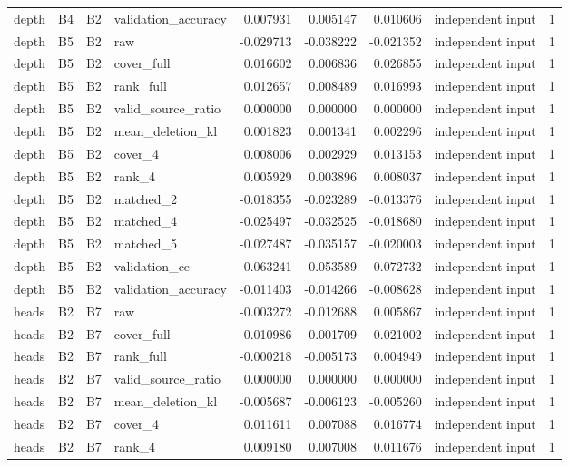 \begin{tabular}{llllrrrlr}
depth & B4 & B2 & validation_accuracy & 0.007931 & 0.005147 & 0.010606 & independent input & 1 \\
depth & B5 & B2 & raw & -0.029713 & -0.038222 & -0.021352 & independent input & 1 \\
depth & B5 & B2 & cover_full & 0.016602 & 0.006836 & 0.026855 & independent input & 1 \\
depth & B5 & B2 & rank_full & 0.012657 & 0.008489 & 0.016993 & independent input & 1 \\
depth & B5 & B2 & valid_source_ratio & 0.000000 & 0.000000 & 0.000000 & independent input & 1 \\
depth & B5 & B2 & mean_deletion_kl & 0.001823 & 0.001341 & 0.002296 & independent input & 1 \\
depth & B5 & B2 & cover_4 & 0.008006 & 0.002929 & 0.013153 & independent input & 1 \\
depth & B5 & B2 & rank_4 & 0.005929 & 0.003896 & 0.008037 & independent input & 1 \\
depth & B5 & B2 & matched_2 & -0.018355 & -0.023289 & -0.013376 & independent input & 1 \\
depth & B5 & B2 & matched_4 & -0.025497 & -0.032525 & -0.018680 & independent input & 1 \\
depth & B5 & B2 & matched_5 & -0.027487 & -0.035157 & -0.020003 & independent input & 1 \\
depth & B5 & B2 & validation_ce & 0.063241 & 0.053589 & 0.072732 & independent input & 1 \\
depth & B5 & B2 & validation_accuracy & -0.011403 & -0.014266 & -0.008628 & independent input & 1 \\
heads & B2 & B7 & raw & -0.003272 & -0.012688 & 0.005867 & independent input & 1 \\
heads & B2 & B7 & cover_full & 0.010986 & 0.001709 & 0.021002 & independent input & 1 \\
heads & B2 & B7 & rank_full & -0.000218 & -0.005173 & 0.004949 & independent input & 1 \\
heads & B2 & B7 & valid_source_ratio & 0.000000 & 0.000000 & 0.000000 & independent input & 1 \\
heads & B2 & B7 & mean_deletion_kl & -0.005687 & -0.006123 & -0.005260 & independent input & 1 \\
heads & B2 & B7 & cover_4 & 0.011611 & 0.007088 & 0.016774 & independent input & 1 \\
heads & B2 & B7 & rank_4 & 0.009180 & 0.007008 & 0.011676 & independent input & 1 \\

\end{tabular}
